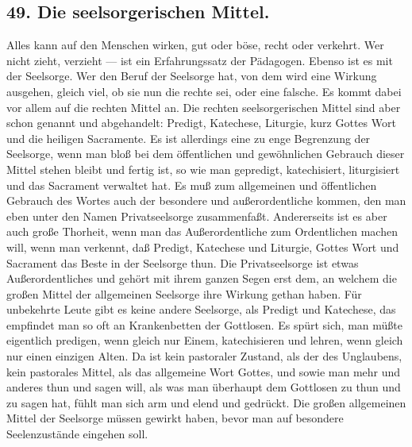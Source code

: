\subsection*{49. Die seelsorgerischen Mittel.}

Alles kann auf den Menschen wirken, gut oder böse, recht oder verkehrt. Wer nicht zieht, verzieht — ist ein Erfahrungssatz der Pädagogen. Ebenso ist es mit der Seelsorge. Wer den Beruf der Seelsorge hat, von dem wird eine Wirkung ausgehen, gleich viel, ob sie nun die rechte sei, oder eine falsche. Es kommt dabei vor allem auf die rechten Mittel an. Die rechten seelsorgerischen Mittel sind aber schon genannt und abgehandelt: Predigt, Katechese, Liturgie, kurz Gottes Wort und die heiligen Sacramente. Es ist allerdings eine zu enge Begrenzung der Seelsorge, wenn man bloß bei dem öffentlichen und gewöhnlichen Gebrauch dieser Mittel stehen bleibt und fertig ist, so wie man gepredigt, katechisiert, liturgisiert und das Sacrament verwaltet hat. Es muß zum allgemeinen und öffentlichen Gebrauch des Wortes auch der besondere und außerordentliche kommen, den man eben unter den Namen Privatseelsorge zusammenfaßt. Andererseits ist es aber auch große Thorheit, wenn man das Außerordentliche zum Ordentlichen machen will, wenn man verkennt, daß Predigt, Katechese und Liturgie, Gottes Wort und Sacrament das Beste in der
Seelsorge thun. Die Privatseelsorge ist etwas Außerordentliches und gehört mit ihrem ganzen Segen erst dem, an welchem die großen Mittel der allgemeinen Seelsorge ihre Wirkung gethan haben. Für unbekehrte Leute gibt es keine andere Seelsorge, als Predigt und Katechese, das empfindet man so oft an Krankenbetten der Gottlosen. Es spürt sich, man müßte eigentlich predigen, wenn gleich nur Einem, katechisieren und lehren, wenn gleich nur einen einzigen Alten. Da ist kein pastoraler Zustand, als der des Unglaubens, kein pastorales Mittel, als das allgemeine Wort Gottes, und sowie man mehr und anderes thun und sagen will, als was man überhaupt dem Gottlosen zu thun und zu sagen hat, fühlt man sich arm und elend und gedrückt. Die großen allgemeinen Mittel der Seelsorge müssen gewirkt haben, bevor man auf besondere Seelenzustände eingehen soll.

